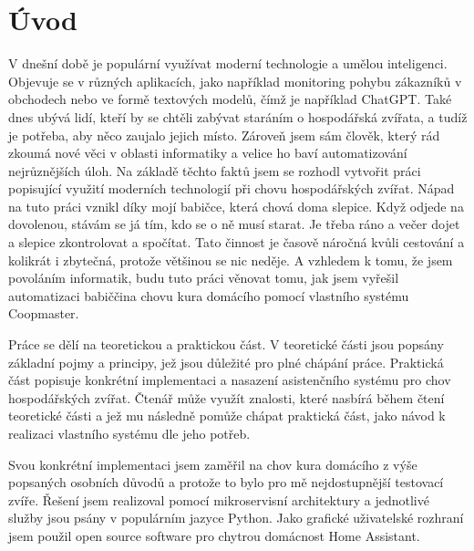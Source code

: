 \chapter{Úvod}\label{ch:uvod}

V dnešní době je populární využívat moderní technologie a umělou inteligenci.
Objevuje se v různých aplikacích, jako například monitoring pohybu zákazníků v obchodech nebo ve formě textových modelů, čímž je například ChatGPT.
Také dnes ubývá lidí, kteří by se chtěli zabývat staráním o hospodářská zvířata, a tudíž je potřeba, aby něco zaujalo jejich místo.
Zároveň jsem sám člověk, který rád zkoumá nové věci v oblasti informatiky a velice ho baví automatizování nejrůznějších úloh.
Na základě těchto faktů jsem se rozhodl vytvořit práci popisující využití moderních technologií při chovu hospodářských zvířat.
Nápad na tuto práci vznikl díky mojí babičce, která chová doma slepice.
Když odjede na dovolenou, stávám se já tím, kdo se o ně musí starat.
Je třeba ráno a večer dojet a slepice zkontrolovat a spočítat.
Tato činnost je časově náročná kvůli cestování a kolikrát i zbytečná, protože většinou se nic neděje.
A vzhledem k tomu, že jsem povoláním informatik, budu tuto práci věnovat tomu, jak jsem vyřešil automatizaci babiččina chovu kura domácího pomocí vlastního systému Coopmaster.\newline

Práce se dělí na teoretickou a praktickou část.
V teoretické části jsou popsány základní pojmy a principy, jež jsou důležité pro plné chápání práce.
Praktická část popisuje konkrétní implementaci a nasazení asistenčního systému pro chov hospodářských zvířat.
Čtenář může využít znalosti, které nasbírá během čtení teoretické části a jež mu následně pomůže chápat praktická část, jako návod k realizaci vlastního systému dle jeho potřeb.\newline

Svou konkrétní implementaci jsem zaměřil na chov kura domácího z výše popsaných osobních důvodů a protože to bylo pro mě nejdostupnější testovací zvíře.
Řešení jsem realizoval pomocí mikroservisní architektury a jednotlivé služby jsou psány v populárním jazyce Python.
Jako grafické uživatelské rozhraní jsem použil open source software pro chytrou domácnost Home Assistant.

